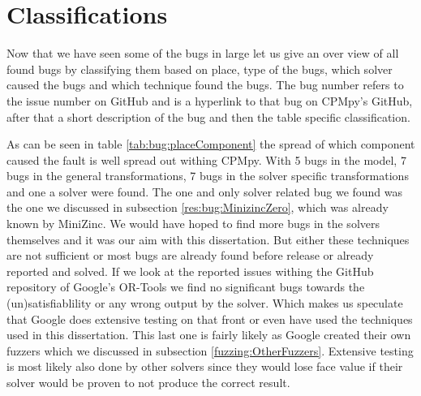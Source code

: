 

\section{Classifications}
Now that we have seen some of the bugs in large let us give an over view of all found bugs by classifying them based on place, type of the bugs, which solver caused the bugs and which technique found the bugs. The bug number refers to the issue number on GitHub and is a hyperlink to that bug on CPMpy's GitHub, after that a short description of the bug and then the table specific classification.

As can be seen in table \ref{tab:bug:placeComponent} the spread of which component caused the fault is well spread out withing CPMpy. 
With 5 bugs in the model, 7 bugs in the general transformations, 7 bugs in the solver specific transformations and one a solver were found. The one and only solver related bug we found was the one we discussed in subsection \ref{res:bug:MinizincZero}, which was already known by MiniZinc. We would have hoped to find more bugs in the solvers themselves and it was our aim with this dissertation. But either these techniques are not sufficient or most bugs are already found before release or already reported and solved.
If we look at the reported issues withing the GitHub repository of Google's OR-Tools we find no significant bugs towards the (un)satisfiablility or any wrong output by the solver. Which makes us speculate that Google does extensive testing on that front or even have used the techniques used in this dissertation. This last one is fairly likely as Google created their own fuzzers which we discussed in subsection  \ref{fuzzing:OtherFuzzers}. Extensive testing is most likely also done by other solvers since they would lose face value if their solver would be proven to not produce the correct result.

